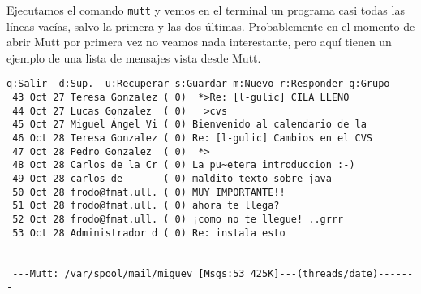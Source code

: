 

% 

Ejecutamos el  comando {\tt mutt} y  vemos en el terminal  un programa
casi todas  las líneas  vacías, salvo  la primera  y las  dos últimas.
Probablemente en  el momento de  abrir {\sf  Mutt} por primera  vez no
veamos nada interestante, pero aquí tienen  un ejemplo de una lista de
mensajes vista desde {\sf Mutt}.

 \begin{verbatim}
q:Salir  d:Sup.  u:Recuperar s:Guardar m:Nuevo r:Responder g:Grupo
 43 Oct 27 Teresa Gonzalez ( 0)  *>Re: [l-gulic] CILA LLENO
 44 Oct 27 Lucas Gonzalez  ( 0)   >cvs
 45 Oct 27 Miguel Ángel Vi ( 0) Bienvenido al calendario de la 
 46 Oct 28 Teresa Gonzalez ( 0) Re: [l-gulic] Cambios en el CVS
 47 Oct 28 Pedro Gonzalez  ( 0)  *>
 48 Oct 28 Carlos de la Cr ( 0) La pu~etera introduccion :-)
 49 Oct 28 carlos de       ( 0) maldito texto sobre java
 50 Oct 28 frodo@fmat.ull. ( 0) MUY IMPORTANTE!!
 51 Oct 28 frodo@fmat.ull. ( 0) ahora te llega?
 52 Oct 28 frodo@fmat.ull. ( 0) ¡como no te llegue! ..grrr
 53 Oct 28 Administrador d ( 0) Re: instala esto
 
 
 ---Mutt: /var/spool/mail/miguev [Msgs:53 425K]---(threads/date)-------
\end{verbatim}

